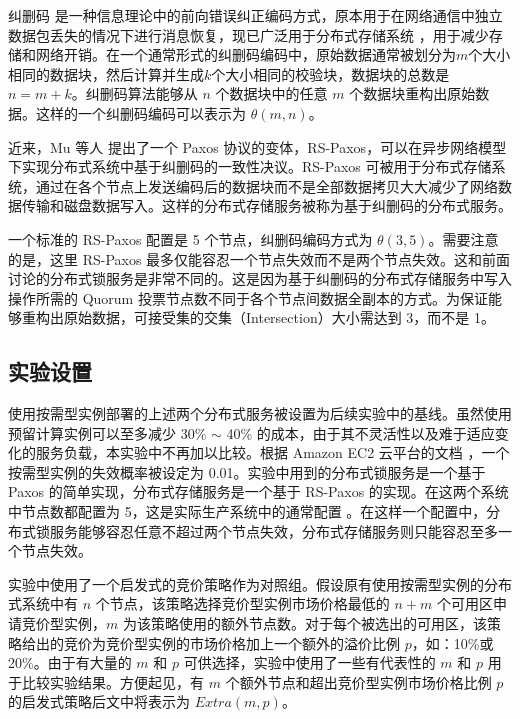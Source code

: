 纠删码 \cite{Rizzo:1997:EEC:263876.263881} 是一种信息理论中的前向错误纠正编码方式，原本用于在网络通信中独立数据包丢失的情况下进行消息恢复，现已广泛用于分布式存储系统 \cite{Huang:2012:ECW:2342821.2342823, Sathiamoorthy:2013:XEN:2488335.2488339}，用于减少存储和网络开销。在一个通常形式的纠删码编码中，原始数据通常被划分为$m$个大小相同的数据块，然后计算并生成$k$个大小相同的校验块，数据块的总数是 $n = m + k$。纠删码算法能够从 $n$ 个数据块中的任意 $m$ 个数据块重构出原始数据。这样的一个纠删码编码可以表示为 $\theta (m,n )$。

近来，Mu 等人 \cite{Mu:2014:PME:2600212.2600218} 提出了一个 Paxos 协议的变体，RS-Paxos，可以在异步网络模型下实现分布式系统中基于纠删码的一致性决议。RS-Paxos 可被用于分布式存储系统，通过在各个节点上发送编码后的数据块而不是全部数据拷贝大大减少了网络数据传输和磁盘数据写入。这样的分布式存储服务被称为基于纠删码的分布式服务。

一个标准的 RS-Paxos 配置是 5 个节点，纠删码编码方式为 $\theta(3, 5)$。需要注意的是，这里 RS-Paxos 最多仅能容忍一个节点失效而不是两个节点失效。这和前面讨论的分布式锁服务是非常不同的。这是因为基于纠删码的分布式存储服务中写入操作所需的 Quorum 投票节点数不同于各个节点间数据全副本的方式。为保证能够重构出原始数据，可接受集的交集（Intersection）大小需达到 3，而不是 1。

\subsection{实验设置}
使用按需型实例部署的上述两个分布式服务被设置为后续实验中的基线。虽然使用预留计算实例可以至多减少 30\% $\sim$ 40\% 的成本，由于其不灵活性以及难于适应变化的服务负载，本实验中不再加以比较。根据 Amazon EC2 云平台的文档 \cite{AWS_SLA:2014} ，一个按需型实例的失效概率被设定为 0.01。实验中用到的分布式锁服务是一个基于 Paxos 的简单实现，分布式存储服务是一个基于 RS-Paxos 的实现\cite{Mu:2014:PME:2600212.2600218}。在这两个系统中节点数都配置为 5，这是实际生产系统中的通常配置 \cite{Burrows:2006:CLS:1298455.1298487, Mu:2014:PME:2600212.2600218}。在这样一个配置中，分布式锁服务能够容忍任意不超过两个节点失效，分布式存储服务则只能容忍至多一个节点失效。

实验中使用了一个启发式的竞价策略作为对照组。假设原有使用按需型实例的分布式系统中有 $n$ 个节点，该策略选择竞价型实例市场价格最低的 $n + m$ 个可用区申请竞价型实例，$m$ 为该策略使用的额外节点数。对于每个被选出的可用区，该策略给出的竞价为竞价型实例的市场价格加上一个额外的溢价比例 $p$，如：10\%或20\%。由于有大量的 $m$ 和 $p$ 可供选择，实验中使用了一些有代表性的 $m$ 和 $p$ 用于比较实验结果。方便起见，有 $m$ 个额外节点和超出竞价型实例市场价格比例 $p$ 的启发式策略后文中将表示为 $Extra(m, p)$。

